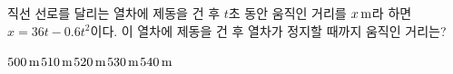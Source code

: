 직선 선로를 달리는 열차에 제동을 건 후 $t$초 동안 움직인 거리를 $x\mkern3mu \mathrm{m}$라 하면 $x=36t-0.6t^2$이다. 이 열차에 제동을 건 후 열차가 정지할 때까지 움직인 거리는?
\begin{choices32}{$500\mkern3mu \mathrm{m}$}{$510\mkern3mu \mathrm{m}$}{$520\mkern3mu \mathrm{m}$}{$530\mkern3mu \mathrm{m}$}{$540\mkern3mu \mathrm{m}$}\end{choices32}
